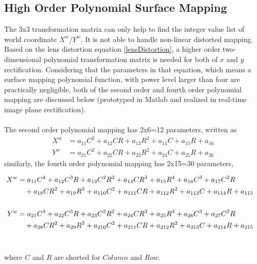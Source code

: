 \subsection{High Order Polynomial Surface Mapping}
%
The 3x3 transformation matrix can only help to find the integer value list of  world coordinate \(X^w\)/\(Y^w\). It is not able to handle non-linear distorted mapping. Based on the lens distortion equation \ref{lensDistortion}, a higher order two-dimensional polynomial transformation matrix is needed for both of \(x\) and \(y\) rectification. Considering that the parameters in that equation, which means a surface mapping polynomial function, with power level larger than four are practically negligible, both of the second order and fourth order polynomial mapping are discussed below (prototyped in Matlab and realized in real-time image plane rectification).\\\\%
%
The second order polynomial mapping has 2x6=12 parameters, written as %
%
\begin{equation}
%
\begin{aligned}
X^w &=  a_{11}C^2 + a_{12}CR + a_{13}R^2 + a_{14}C + a_{15}R + a_{16}
\\%
Y^w &=  a_{21}C^2 + a_{22}CR + a_{23}R^2 + a_{24}C + a_{25}R + a_{26}
\end{aligned}
\label{secondOrderPolynomial}
%
\end{equation}%
%
similarly, the fourth order polynomial mapping has 2x15=30 parameters,\par%
%
\begin{equation}
%
\hspace*{-0.3cm}%
\begin{aligned}
X^w &=  a_{11}C^4 + a_{12}C^3R + a_{13}C^2R^2 + a_{14}CR^3 + a_{15}R^4 + a_{16}C^3 + a_{17}C^2R \\%
&\,\,\,\,\,\,+ a_{18}CR^2 + a_{19}R^3 + a_{110}C^2 + a_{111}CR + a_{112}R^2 + a_{113}C + a_{114}R + a_{115}
\\\\%
Y^w &=  a_{21}C^4 + a_{22}C^3R + a_{23}C^2R^2 + a_{24}CR^3 + a_{25}R^4 + a_{26}C^3 + a_{27}C^2R \\%
&\,\,\,\,\,\,+ a_{28}CR^2 + a_{29}R^3 + a_{210}C^2 + a_{211}CR + a_{212}R^2 + a_{213}C + a_{214}R + a_{215}
\end{aligned}
\label{fourthOrderPolynomial}
%
\end{equation}%
\\\par%
%
where \(C\) and \(R\) are shorted for \(Column\) and \(Row\).
